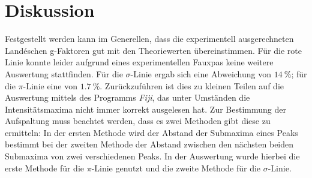\section{Diskussion}
Festgestellt werden kann im Generellen, dass die experimentell ausgerechneten Landéschen g-Faktoren gut mit den Theoriewerten übereinstimmen. Für die rote Linie konnte leider aufgrund eines experimentellen Fauxpas keine weitere Auswertung stattfinden.
Für die $\sigma$-Linie ergab sich eine Abweichung von $\SI{14}{\%}$; für die $\pi$-Linie eine von $\SI{1,7}{\%}$. Zurückzuführen ist dies zu kleinen Teilen auf die Auswertung mittels des Programms \textit{Fiji}, das unter Umständen die Intensitätsmaxima nicht immer korrekt ausgelesen hat.
Zur Bestimmung der Aufspaltung muss beachtet werden, dass es zwei Methoden gibt diese zu ermitteln:
In der ersten Methode wird der Abstand der Submaxima eines Peaks bestimmt bei der zweiten Methode der Abstand zwischen den nächsten beiden Submaxima von zwei verschiedenen Peaks. In der Auswertung wurde hierbei die erste Methode für die $\pi$-Linie genutzt und die zweite Methode für die $\sigma$-Linie.
